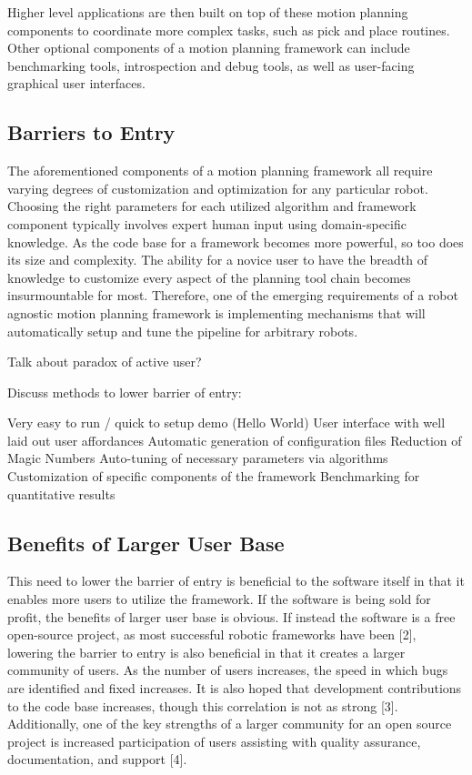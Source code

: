 \documentclass[10pt,journal,compsoc]{joser1}
\begin{document}
{Higher level applications are then built on top of these motion planning components to coordinate more complex tasks, such as pick and place routines. Other optional components of a motion planning framework can include benchmarking tools, introspection and debug tools, as well as user-facing graphical user interfaces. 


\subsection{Barriers to Entry}

The aforementioned components of a motion planning framework all require varying degrees of customization and optimization for any particular robot. Choosing the right parameters for each utilized algorithm and framework component typically involves expert human input using domain-specific knowledge. As the code base for a framework becomes more powerful, so too does its size and complexity. The ability for a novice user to have the breadth of knowledge to customize every aspect of the planning tool chain becomes insurmountable for most. Therefore, one of the emerging requirements of a robot agnostic motion planning framework is implementing mechanisms that will automatically setup and tune the pipeline for arbitrary robots.

Talk about paradox of active user?

Discuss methods to lower barrier of entry:

Very easy to run / quick to setup demo (Hello World)
User interface with well laid out user affordances
Automatic generation of configuration files
Reduction of Magic Numbers
Auto-tuning of necessary parameters via algorithms
Customization of specific components of the framework
Benchmarking for quantitative results

\subsection{Benefits of Larger User Base}

This need to lower the barrier of entry is beneficial to the software itself in that it enables more users to utilize the framework. If the software is being sold for profit, the benefits of larger user base is obvious. If instead the software is a free open-source project, as most successful robotic frameworks have been [2], lowering the barrier to entry is also beneficial in that it creates a larger community of users. As the number of users increases, the speed in which bugs are identified and fixed increases. It is also hoped that development contributions to the code base increases, though this correlation is not as strong [3]. Additionally, one of the key strengths of a larger community for an open source project is increased participation of users assisting with quality assurance, documentation, and support [4].

}
\end{document}
